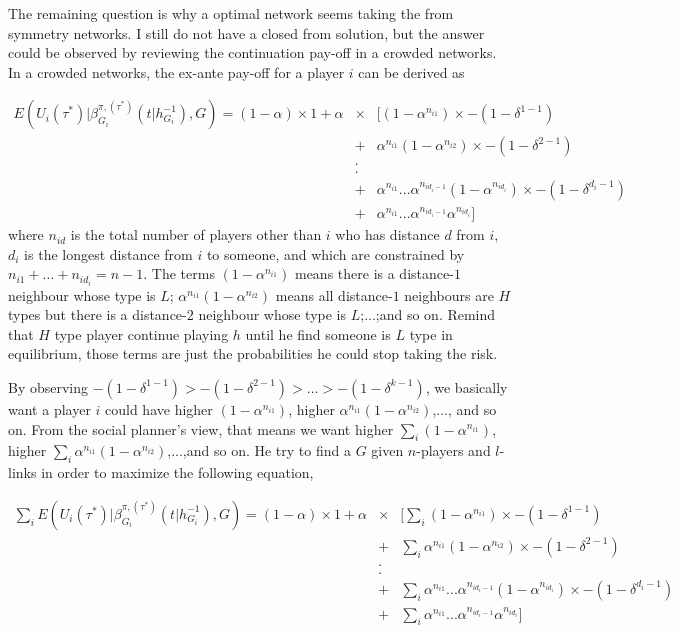 \documentclass[12pt,letter]{article}
\theoremstyle{remark}
\theoremstyle{remark}
\theoremstyle{claim}
\begin{document}
The remaining question is why a optimal network seems taking the from symmetry networks. I still do not have a closed from solution, but the answer could be observed by reviewing the continuation pay-off in a crowded networks. In a crowded networks, the ex-ante pay-off for a player $i$ can be derived as 

\begin{eqnarray*}
E(U_i(\tau^{*})|\beta^{\pi,(\tau^{*})}_{G_i}(t|h^{-1}_{G_i}), G)=(1-\alpha)\times 1+\alpha &\times &[(1-\alpha^{n_{i1}})\times -(1-\delta^{1-1})\\
&+&\alpha^{n_{i1}}(1-\alpha^{n_{i2}})\times -(1-\delta^{2-1})\\
&.&\\
&.&\\
&+&\alpha^{n_{i1}}...\alpha^{n_{id_i-1}}(1-\alpha^{n_{id_i}})\times -(1-\delta^{d_i-1})\\
&+&\alpha^{n_{i1}}...\alpha^{n_{id_i-1}}\alpha^{n_{id_i}}]
\end{eqnarray*}
where $n_{id}$ is the total number of players other than $i$ who has distance $d$ from $i$, $d_i$ is the longest distance from $i$ to someone, and which are constrained by $n_{i1}+...+n_{id_i}=n-1$. The terms $(1-\alpha^{n_{i1}})$ means there is a distance-$1$ neighbour whose type is $L$; $\alpha^{n_{i1}}(1-\alpha^{n_{i2}})$ means all distance-$1$ neighbours are $H$ types but there is a distance-$2$ neighbour whose type is $L$;...;and so on. Remind that $H$ type player continue playing $h$ until he find someone is $L$ type in equilibrium, those terms are just the probabilities he could stop taking the risk.

By observing $-(1-\delta^{1-1})>-(1-\delta^{2-1})>...>-(1-\delta^{k-1})$, we basically want a player $i$ could have higher $(1-\alpha^{n_{i1}})$, higher $\alpha^{n_{i1}}(1-\alpha^{n_{i2}})$,..., and so on. From the social planner's view, that means we want higher $\sum_i(1-\alpha^{n_{i1}})$, higher $\sum_i\alpha^{n_{i1}}(1-\alpha^{n_{i2}})$,...,and so on. He try to find a $G$ given $n$-players and $l$-links in order to maximize the following equation,

\begin{eqnarray*}
\sum_i E(U_i(\tau^{*})     |\beta^{\pi,(\tau^{*})}_{G_i}(t|h^{-1}_{G_i}), G)=(1-\alpha)\times 1+\alpha &\times &[\sum_i(1-\alpha^{n_{i1}})\times -(1-\delta^{1-1})\\
&+&\sum_i\alpha^{n_{i1}}(1-\alpha^{n_{i2}})\times -(1-\delta^{2-1})\\
&.&\\
&.&\\
&+&\sum_i\alpha^{n_{i1}}...\alpha^{n_{id_i-1}}(1-\alpha^{n_{id_i}})\times -(1-\delta^{d_i-1})\\
&+&\sum_i\alpha^{n_{i1}}...\alpha^{n_{id_i-1}}\alpha^{n_{id_i}}]
\end{eqnarray*}
\end{document}

